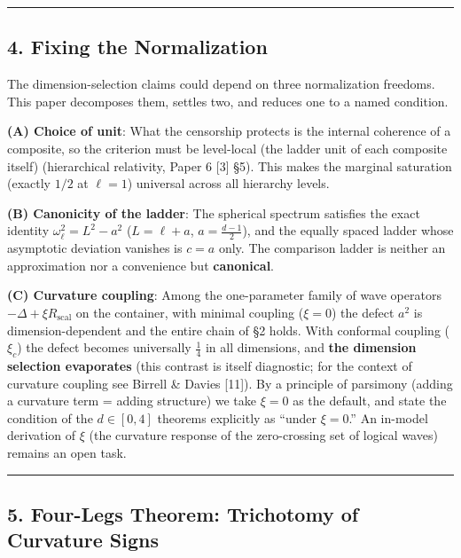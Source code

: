 \documentclass[
]{ltjsarticle}
\begin{document}
\begin{center}\rule{0.5\linewidth}{0.5pt}\end{center}

\subsection{4. Fixing the Normalization}\label{fixing-the-normalization}

The dimension-selection claims could depend on three normalization
freedoms. This paper decomposes them, settles two, and reduces one to a
named condition.

\textbf{(A) Choice of unit}: What the censorship protects is the
internal coherence of a composite, so the criterion must be level-local
(the ladder unit of each composite itself) (hierarchical relativity,
Paper 6 {[}3{]} §5). This makes the marginal saturation (exactly \(1/2\)
at \(\ell=1\)) universal across all hierarchy levels.

\textbf{(B) Canonicity of the ladder}: The spherical spectrum satisfies
the exact identity \(\omega_\ell^2=L^2-a^2\) (\(L=\ell+a\),
\(a=\tfrac{d-1}2\)), and the equally spaced ladder whose asymptotic
deviation vanishes is \(c=a\) only. The comparison ladder is neither an
approximation nor a convenience but \textbf{canonical}.

\textbf{(C) Curvature coupling}: Among the one-parameter family of wave
operators \(-\Delta+\xi R_{\mathrm{scal}}\) on the container, with
minimal coupling (\(\xi=0\)) the defect \(a^2\) is dimension-dependent
and the entire chain of §2 holds. With conformal coupling (\(\xi_c\))
the defect becomes universally \(\tfrac14\) in all dimensions, and
\textbf{the dimension selection evaporates} (this contrast is itself
diagnostic; for the context of curvature coupling see Birrell \& Davies
{[}11{]}). By a principle of parsimony (adding a curvature term = adding
structure) we take \(\xi=0\) as the default, and state the condition of
the \(d\in[0,4]\) theorems explicitly as ``under \(\xi=0\).'' An
in-model derivation of \(\xi\) (the curvature response of the
zero-crossing set of logical waves) remains an open task.

\begin{center}\rule{0.5\linewidth}{0.5pt}\end{center}

\subsection{5. Four-Legs Theorem: Trichotomy of Curvature
Signs}\label{four-legs-theorem-trichotomy-of-curvature-signs}
\end{document}
